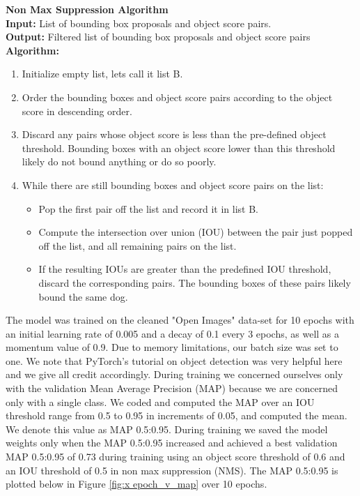 \documentclass{article}
\begin{document}
\begin{minipage}{1\textwidth}%
	\noindent \textbf{Non Max Suppression Algorithm} \\

  \noindent \textbf{Input:} List of bounding box proposals and object score pairs. \\
  
  \noindent \textbf{Output:} Filtered list of bounding box proposals and object score pairs \\
  
  \noindent \textbf{Algorithm:} \\
\end{minipage}%

\begin{enumerate}

  \item Initialize empty list, lets call it list B.

  \item Order the bounding boxes and object score pairs according to the object score in descending order.
  
  \item Discard any pairs whose object score is less than the pre-defined object threshold.  Bounding boxes with an object score lower than this threshold likely do not bound anything or do so poorly.
  
  \item While there are still bounding boxes and object score pairs on the list:
        \begin{itemize}
             \item Pop the first pair off the list and record it in list B.
            
             \item Compute the intersection over union (IOU) between the pair just popped off the list, and all remaining pairs on the list.
             \item If the resulting IOUs are greater than the predefined IOU threshold, discard the corresponding pairs.  The bounding boxes of these pairs likely bound the same dog.
        \end{itemize}
\end{enumerate}


The model was trained on the cleaned "Open Images" data-set for 10 epochs with an initial learning rate of 0.005 and a decay of 0.1 every 3 epochs, as well as a momentum value of 0.9.  Due to memory limitations, our batch size was set to one.  We note that PyTorch's tutorial on object detection \cite{TorchVision} was very helpful here and we give all credit accordingly.  During training we concerned ourselves only with the validation Mean Average Precision (MAP) because we are concerned only with a single class.  We coded and computed the MAP over an IOU threshold range from 0.5 to 0.95 in increments of 0.05, and computed the mean.  We denote this value as MAP 0.5:0.95.  During training we saved the model weights only when the MAP 0.5:0.95 increased and achieved a best validation MAP 0.5:0.95 of 0.73 during training using an object score threshold of 0.6 and an IOU threshold of 0.5 in non max suppression (NMS).  The MAP 0.5:0.95 is plotted below in Figure \ref{fig:x epoch_v_map} over 10 epochs. 
\end{document}

